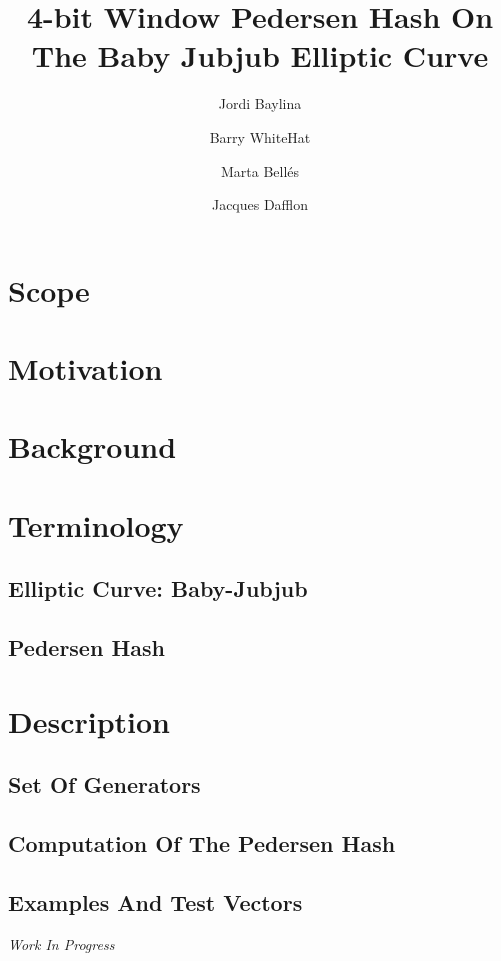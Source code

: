 \documentclass[11pt]{article}
\title{4-bit Window Pedersen Hash On The Baby Jubjub Elliptic Curve}
\author[1]{Jordi Baylina}
\author[2]{Barry WhiteHat}
\author[1,3]{Marta Bellés}
\author[1]{Jacques Dafflon}
\affil[1]{iden3}
\affil[2]{Ethereum foundation}
\affil[3]{Universitat Pompeu Fabra}
\date{} %
\begin{document}
	{\maketitle}
	\vspace{-0.2cm}
	\tableofcontents
	
	
	\newpage

    \section{Scope}
        
	\section{Motivation}
        
    \section{Background}
        

	\section{Terminology}	
		\subsection{Elliptic Curve: Baby-Jubjub}
			
		\subsection{Pedersen Hash}
			
	
	\section{Description}
	
	\subsection{Set Of Generators}
		
		\subsection{Computation Of The Pedersen Hash}
		
		\label{sec-computation}
		\subsection{Examples And Test Vectors}
		\emph{Work In Progress}
		
\end{document}
